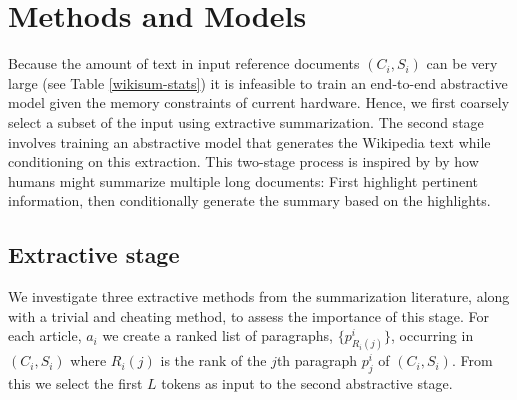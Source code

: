 \section{Methods and Models}
Because the amount of text in input reference documents $(C_i, S_i)$
can be very large
(see Table \ref{wikisum-stats})
it is infeasible to train an end-to-end abstractive model given the memory constraints
of current hardware.
Hence, we first coarsely select a subset of the input using
extractive summarization.
The second stage involves training an abstractive model that generates
the Wikipedia text while conditioning on this extraction. This two-stage
process is inspired by
by how humans might summarize multiple long documents: First highlight
pertinent information, then conditionally generate the summary based on
the highlights.

\subsection{Extractive stage}
We investigate three  extractive methods from the summarization literature,
along with a trivial and cheating method,  to assess the importance of this stage.
For each article, $a_i$ we create a ranked list of paragraphs,
$\{p^i_{R_i(j)}\}$, occurring in $(C_i, S_i)$ where $R_i(j)$ is the rank of the $j$th paragraph $p^i_j$ of $(C_i, S_i)$.
From this we select the first $L$ tokens as input to the second
abstractive stage.


